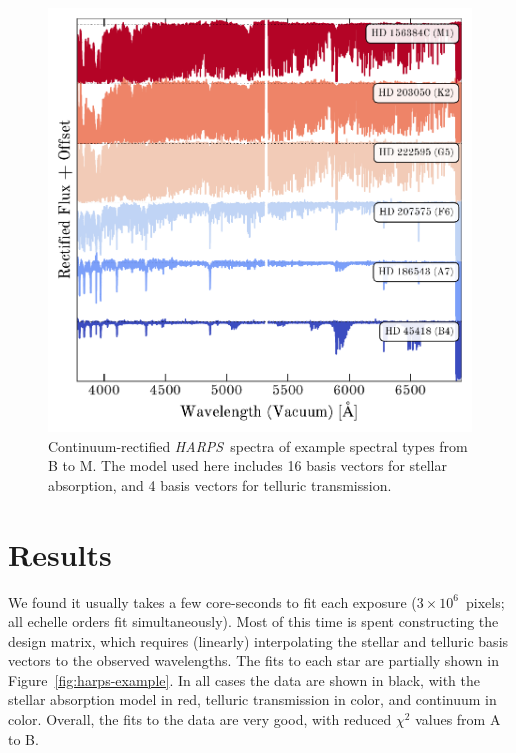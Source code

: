 \documentclass[modern]{aastex631}
\newcommand{\project}[1]{\textit{#1}}
\newcommand{\harps}{\project{HARPS}}
\newcommand{\todo}[1]{\textcolor{tab:red}{#1}}
\begin{document}
\begin{figure}
    \includegraphics[width=\textwidth, height=\textwidth]{../code/harps_examples.pdf}
    \caption{Continuum-rectified \harps\ spectra of example spectral types from B to M. The model used here includes 16 basis vectors for stellar absorption, and 4 basis vectors for telluric transmission.\label{fig:harps-examples}}
\end{figure}


\section{Results} \label{sec:results}

We found it usually takes a few core-seconds to fit each exposure ($3\times10^6$~pixels; all echelle orders fit simultaneously). Most of this time is spent constructing the design matrix, which requires (linearly) interpolating the stellar and telluric basis vectors to the observed wavelengths. The fits to each star are partially shown in Figure~\ref{fig:harps-example}. In all cases the data are shown in black, with the stellar absorption model in \todo{red}, telluric transmission in \todo{color}, and continuum in \todo{color}. Overall, the fits to the data are very good, with reduced $\chi^2$ values from \todo{A to B}.\\
\end{document}
